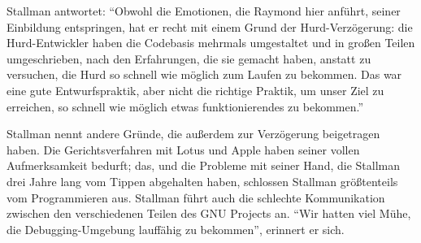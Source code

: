 Stallman antwortet: "`Obwohl die Emotionen, die Raymond hier anführt, seiner Einbildung entspringen, hat er recht mit einem Grund der Hurd-Verzögerung: die Hurd-Entwickler haben die Codebasis mehrmals umgestaltet und in großen Teilen umgeschrieben, nach den Erfahrungen, die sie gemacht haben, anstatt zu versuchen, die Hurd so schnell wie möglich zum Laufen zu bekommen. Das war eine gute Entwurfspraktik, aber nicht die richtige Praktik, um unser Ziel zu erreichen, so schnell wie möglich etwas funktionierendes zu bekommen."'

Stallman nennt andere Gründe, die außerdem zur Verzögerung beigetragen haben. Die Gerichtsverfahren mit Lotus und Apple haben seiner vollen Aufmerksamkeit bedurft; das, und die Probleme mit seiner Hand, die Stallman drei Jahre lang vom Tippen abgehalten haben, schlossen Stallman größtenteils vom Programmieren aus. Stallman führt auch die schlechte Kommunikation zwischen den verschiedenen Teilen des GNU Projects an. "`Wir hatten viel Mühe, die Debugging-Umgebung lauffähig zu bekommen"', erinnert er sich.

